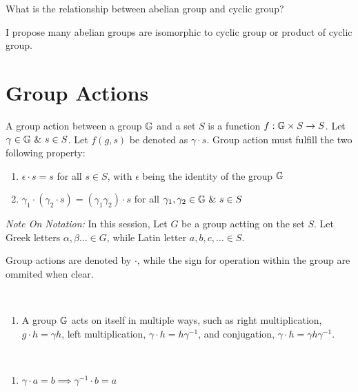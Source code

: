 \documentclass[../note.tex]{subfiles}
\begin{document}
\begin{hypothesis}
	What is the relationship between abelian group and cyclic group? 

	I propose many abelian groups are isomorphic to cyclic group or product of cyclic group.
\end{hypothesis}

\section{Group Actions}
\begin{definition}\label{def:group_action} \hypertarget{def:group_action}{}
	A group action between a group $\mathbb{G}$ and a set $S$ is a function $f: \mathbb{G}\times S \rightarrow S$. 
	Let $\gamma \in \mathbb{G} \ \&\ s \in S$. Let $f(g,s)$ be denoted as $\gamma\cdot s$. Group action must fulfill the two following property:
	\begin{enumerate}
		\item $\epsilon\cdot s=s$ for all $s\in S$, with $\epsilon$ being the identity of the group $\mathbb{G}$
		\item $\gamma_1\cdot(\gamma_2 \cdot s) = (\gamma_1 \gamma_2) \cdot s$ for all $\gamma_1, \gamma_2 \in \bb{G}\ \&\ s \in S$
	\end{enumerate}
\end{definition}

\emph{Note On Notation:}
In this session, Let $G$ be a group actting on the set $S$. Let Greek letters $\alpha, \beta \dots \in G$, while Latin letter $a,b,c, \dots \in S$. 

Group actions are denoted by $\cdot$, while the sign for operation within the group are ommited when clear.

\begin{example}
	\ 
\begin{enumerate}
	\item A group $\mathbb{G}$ acts on itself in multiple ways, such as right multiplication, $g\cdot h=\gamma h$, left multiplication, $\gamma\cdot h = h\gamma^{-1}$, and conjugation, $\gamma\cdot h = \gamma h\gamma^{-1}$.
\end{enumerate}
\end{example}
\begin{theorem}
	\ 
	\begin{enumerate}
		\item $\gamma \cdot a = b \implies \gamma^{-1} \cdot b = a$ 
	\end{enumerate}
\end{theorem}
\end{document}
